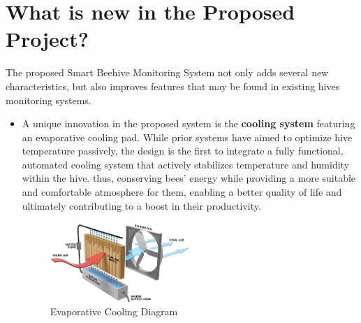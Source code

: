 \documentclass[12pt]{article}
\begin{document}
	\section{What is new in the Proposed Project?}
	The proposed Smart Beehive Monitoring System not only adds several new characteristics, but also improves features that may be found in existing hives monitoring systems. \\
	\begin{itemize}
		\item A unique innovation in the proposed system is the \textbf{cooling system} featuring an evaporative cooling pad. While prior systems have aimed to optimize hive temperature passively, the design is the first to integrate a fully functional, automated cooling system that actively stabilizes temperature and humidity within the hive. thus, conserving bees' energy while providing a more suitable and comfortable atmosphere  for them, enabling a better quality of life and ultimately contributing to a boost in their productivity. \\
		\begin{figure}[H]
			\centering
			\includegraphics[width=0.5\textwidth]{Images/swamp-cooler-diagram.jpg}
			\caption{Evaporative Cooling Diagram \cite{powerbreezer2021}}
			\label{fig:EVAPORATIVE_COOLER}
		\end{figure}
		

\end{itemize}
\end{document}
